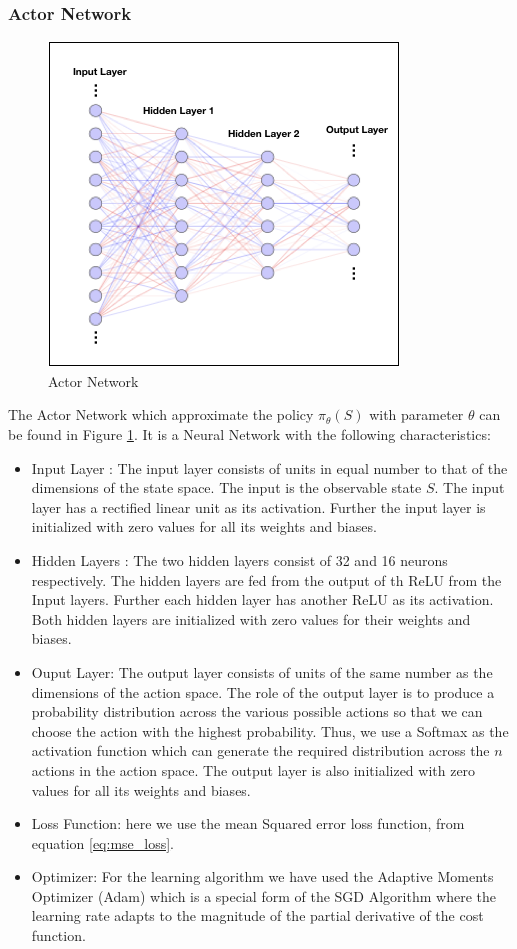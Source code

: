 \documentclass[12pt]{extarticle}
\numberwithin{equation}{section}
\begin{document}
	\subsubsection{Actor Network}
	\begin{figure}[H]
		\vspace{0.2cm}
		\centering
		\includegraphics[scale=0.6]{nn-actor}
		\caption{Actor Network
			\label{nn-actor}}
	\end{figure}
	The Actor Network which approximate the policy $\pi_{\theta}(S)$ with parameter $\theta$ can be found in Figure \ref{nn-actor}. It is a Neural Network with the following characteristics:
	\begin{itemize}
		\item Input Layer : The input layer consists of units in equal number to that of the dimensions of the state space. The input is the observable state $S$. The input layer has a rectified linear unit as its activation. Further the input layer is initialized with zero values for all its weights and biases. 
		\item Hidden Layers : The two hidden layers consist of 32 and 16 neurons respectively. The hidden layers are fed from the output of th ReLU from the Input layers. Further each hidden layer has another ReLU as its activation. Both hidden layers are initialized with zero values for their weights and biases.
		\item Ouput Layer: The output layer consists of units of the same number as the dimensions of the action space. The role of the output layer is to produce a probability distribution across the various possible actions so that we can choose the action with the highest probability. Thus, we use a Softmax as the activation function which can generate the required distribution across the $n$ actions in the action space. The output layer is also initialized with zero values for all its weights and biases.
		\item Loss Function: here we use the mean Squared error loss function, from equation \eqref{eq:mse_loss}.
		\item Optimizer: For the learning algorithm we have used the Adaptive Moments Optimizer (Adam)\cite{kingma2014adam} which is a special form of the SGD Algorithm where the learning rate adapts to the magnitude of the partial derivative of the cost function. 
	\end{itemize}
\end{document}
